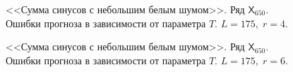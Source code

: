 \documentclass[specialist,
               substylefile = spbu.rtx,
               subf,href,colorlinks=true, 12p]{disser}
\begin{document}
\begin{figure}[H]
	\captionsetup{justification=centering}
	\caption{<<Сумма синусов с небольшим белым шумом>>. Ряд $\mathsf{X}_{650}$. Ошибки прогноза в зависимости от параметра $T$. $L = 175, \; r = 4$.}
\end{figure}

\begin{figure}[H]
	\captionsetup{justification=centering}
	\caption{<<Сумма синусов с небольшим белым шумом>>. Ряд $\mathsf{X}_{650}$. Ошибки прогноза в зависимости от параметра $T$. $L = 175, \; r = 6$.}
\end{figure}
\end{document}
